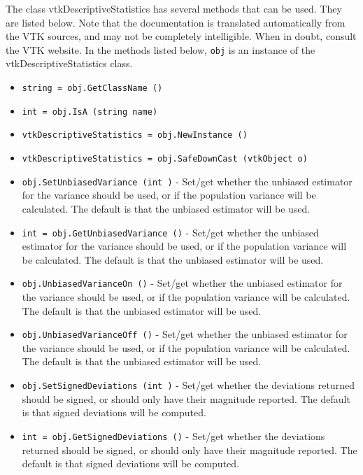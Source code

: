 The class vtkDescriptiveStatistics has several methods that can be used.
  They are listed below.
Note that the documentation is translated automatically from the VTK sources,
and may not be completely intelligible.  When in doubt, consult the VTK website.
In the methods listed below, \verb|obj| is an instance of the vtkDescriptiveStatistics class.
\begin{itemize}
\item  \verb|string = obj.GetClassName ()|

\item  \verb|int = obj.IsA (string name)|

\item  \verb|vtkDescriptiveStatistics = obj.NewInstance ()|

\item  \verb|vtkDescriptiveStatistics = obj.SafeDownCast (vtkObject o)|

\item  \verb|obj.SetUnbiasedVariance (int )| -  Set/get whether the unbiased estimator for the variance should be used, or if
 the population variance will be calculated.
 The default is that the unbiased estimator will be used.

\item  \verb|int = obj.GetUnbiasedVariance ()| -  Set/get whether the unbiased estimator for the variance should be used, or if
 the population variance will be calculated.
 The default is that the unbiased estimator will be used.

\item  \verb|obj.UnbiasedVarianceOn ()| -  Set/get whether the unbiased estimator for the variance should be used, or if
 the population variance will be calculated.
 The default is that the unbiased estimator will be used.

\item  \verb|obj.UnbiasedVarianceOff ()| -  Set/get whether the unbiased estimator for the variance should be used, or if
 the population variance will be calculated.
 The default is that the unbiased estimator will be used.

\item  \verb|obj.SetSignedDeviations (int )| -  Set/get whether the deviations returned should be signed, or should
 only have their magnitude reported.
 The default is that signed deviations will be computed.

\item  \verb|int = obj.GetSignedDeviations ()| -  Set/get whether the deviations returned should be signed, or should
 only have their magnitude reported.
 The default is that signed deviations will be computed.


\end{itemize}
